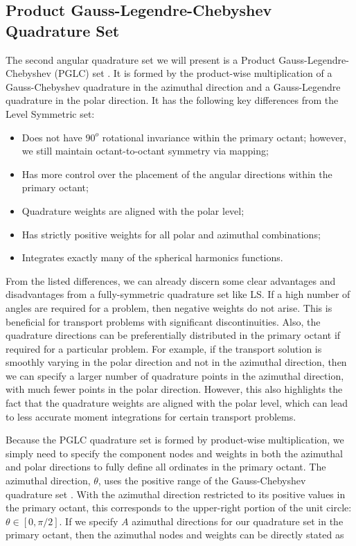 \subsection{Product Gauss-Legendre-Chebyshev Quadrature Set}
\label{sec::Sn_Angle_PGLC}

The second angular quadrature set we will present is a Product Gauss-Legendre-Chebyshev (PGLC) set \cite{abu1977compatible}. It is formed by the product-wise multiplication of a Gauss-Chebyshev quadrature in the azimuthal direction and a Gauss-Legendre quadrature in the polar direction. It has the following key differences from the Level Symmetric set:

\begin{itemize}
	\item Does not have $90^o$ rotational invariance within the primary octant; however, we still maintain octant-to-octant symmetry via mapping;
	\item Has more control over the placement of the angular directions within the primary octant;
	\item Quadrature weights are aligned with the polar level;
	\item Has strictly positive weights for all polar and azimuthal combinations;
	\item Integrates exactly many of the spherical harmonics functions.
\end{itemize}

From the listed differences, we can already discern some clear advantages and disadvantages from a fully-symmetric quadrature set like LS. If a high number of angles are required for a problem, then negative weights do not arise. This is beneficial for transport problems with significant discontinuities. Also, the quadrature directions can be preferentially distributed in the primary octant if required for a particular problem. For example, if the transport solution is smoothly varying in the polar direction and not in the azimuthal direction, then we can specify a larger number of quadrature points in the azimuthal direction, with much fewer points in the polar direction. However, this also highlights the fact that the quadrature weights are aligned with the polar level, which can lead to less accurate moment integrations for certain transport problems. 

Because the PGLC quadrature set is formed by product-wise multiplication, we simply need to specify the component nodes and weights in both the azimuthal and polar directions to fully define all ordinates in the primary octant. The azimuthal direction, $\theta$, uses the positive range of the Gauss-Chebyshev quadrature set \cite{abramowitz1966handbook}. With the azimuthal direction restricted to its positive values in the primary octant, this corresponds to the upper-right portion of the unit circle: $\theta \in [0, \pi / 2]$. If we specify $A$ azimuthal directions for our quadrature set in the primary octant, then the azimuthal nodes and weights can be directly stated as 

